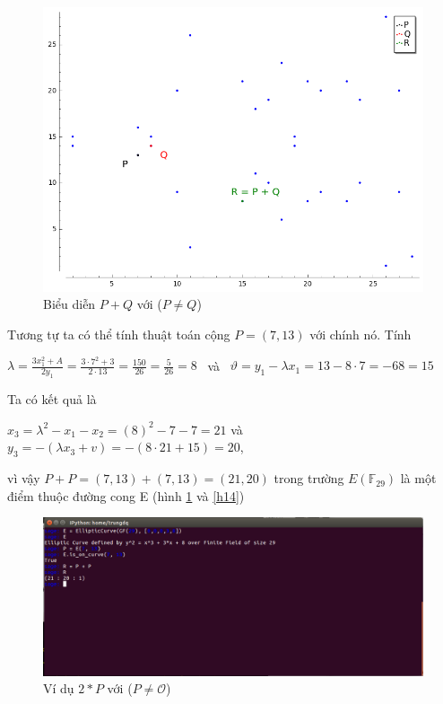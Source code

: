 \documentclass[a4paper,12pt]{report}
\begin{document}
\begin{center}
\begin{figure}[H]
\includegraphics[width=0.8\linewidth]{../im13.png}
\caption{Biểu diễn $P + Q$ với ($P \neq Q$)}
\end{figure}
\end{center}
Tương tự ta có thể tính thuật toán cộng $P = (7, 13)$ với chính nó. Tính
\begin{center}
$\displaystyle \lambda = \frac{3x_1^2 + A}{2y_1} = \frac{3\cdot7^2 + 3}{2\cdot13} = \frac{150}{26} = \frac{5}{26} = 8$ \ và \ $\vartheta = y_1 - \lambda x_1 = 13 - 8\cdot7 = -68 = 15$
\end{center}
Ta có kết quả là 
\begin{center}
$x_3 = \lambda^2 - x_1 - x_2 = (8)^2 - 7 - 7 = 21$ và $y_3 = -(\lambda x_3 + v) = -(8\cdot21 + 15) = 20$,
\end{center}
vì vậy $P + P = (7, 13) + (7, 13) = (21,20)$ trong trường $E(\mathbb{F}_{29})$ là một điểm thuộc đường cong E (hình \ref{h18} và \ref{h14})
\begin{center}
\begin{figure}[H]
\includegraphics[width=0.9\linewidth]{../im18.png}
\caption{Ví dụ $2*P$ với ($P \neq \mathcal{O}$)} \label{h18}
\end{figure}
\end{center}
\end{document}
